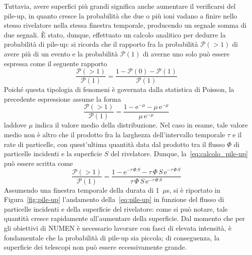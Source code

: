 Tuttavia, avere superfici più grandi significa anche aumentare il verificarsi del pile-up, in quanto cresce la probabilità che due o più ioni vadano a finire nello stesso rivelatore nella stessa finestra temporale, producendo un segnale somma di due segnali.
È stato, dunque, effettuato un calcolo analitico per dedurre la probabilità di pile-up: si ricorda che il rapporto fra la probabilità $\mathcal{P}(> \! 1)$ di avere più di un evento e la probabilità $\mathcal{P}(1)$ di averne uno solo può essere espressa come il seguente rapporto
\begin{equation}
\frac{\mathcal{P}(> \! 1)}{\mathcal{P}(1)} = \frac{1 - 
	\mathcal{P}(0) - \mathcal{P}(1)}{\mathcal{P}(1)}
\end{equation}
Poiché questa tipologia di fenomeni è governata dalla statistica di Poisson, la precedente espressione assume la forma
\begin{equation}  \label{eq:calcolo_pile-up}
\frac{\mathcal{P}(> \! 1)}{\mathcal{P}(1)} = \frac{1 - 
	\mbox{e}^{-\mu} - \mu \,\mbox{e}^{- \mu}}{\mu \, \mbox{e}^{- \mu}}
\end{equation}
laddove $\mu$ indica il valore medio della distribuzione.
Nel caso in esame, tale valore medio non è altro che il prodotto fra la larghezza dell'intervallo temporale $\tau$ e il rate di particelle, con quest'ultima quantità data dal prodotto tra il flusso $\Phi$ di particelle incidenti e la superficie $S$ del rivelatore.
Dunque, la~\ref{eq:calcolo_pile-up} può essere scritta come
\begin{equation} \label{eq:pile-up}
\frac{\mathcal{P}(> \! 1)}{\mathcal{P}(1)} = \frac{1 - 
	\mbox{e}^{- \tau \, \Phi \, S} - \tau \, \Phi \, S \,\mbox{e}^{- \tau\, \Phi \, S}}{\tau \, \Phi \, S \, \mbox{e}^{- \tau \, \Phi \, S}}
\end{equation} 
Assumendo una finestra temporale della durata di 1~$\mu$s, si è riportato in Figura~\ref{fig:pile-up} l'andamento della~\ref{eq:pile-up} in funzione del flusso di particelle incidenti e della superficie del rivelatore: come si può notare, tale quantità cresce rapidamente all'aumentare della superficie.
Dal momento che per gli obiettivi di NUMEN è necessario lavorare con fasci di elevata intensità, è fondamentale che la probabilità di pile-up sia piccola; di conseguenza, la superficie dei telescopi non può essere eccessivamente grande.



